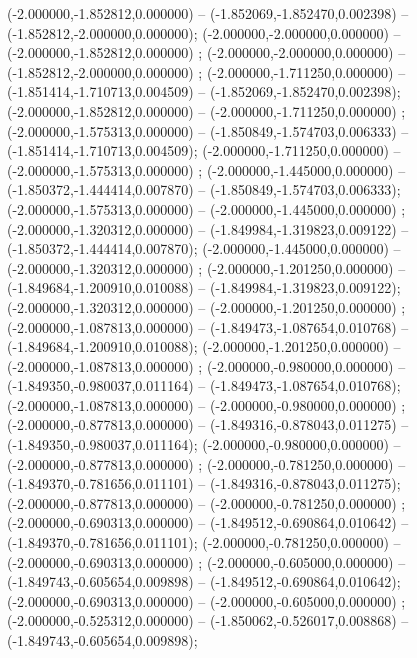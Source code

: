  (-2.000000,-1.852812,0.000000) -- (-1.852069,-1.852470,0.002398) -- (-1.852812,-2.000000,0.000000);
 (-2.000000,-2.000000,0.000000) -- (-2.000000,-1.852812,0.000000) ;
 (-2.000000,-2.000000,0.000000) -- (-1.852812,-2.000000,0.000000) ;
 (-2.000000,-1.711250,0.000000) -- (-1.851414,-1.710713,0.004509) -- (-1.852069,-1.852470,0.002398);
 (-2.000000,-1.852812,0.000000) -- (-2.000000,-1.711250,0.000000) ;
 (-2.000000,-1.575313,0.000000) -- (-1.850849,-1.574703,0.006333) -- (-1.851414,-1.710713,0.004509);
 (-2.000000,-1.711250,0.000000) -- (-2.000000,-1.575313,0.000000) ;
 (-2.000000,-1.445000,0.000000) -- (-1.850372,-1.444414,0.007870) -- (-1.850849,-1.574703,0.006333);
 (-2.000000,-1.575313,0.000000) -- (-2.000000,-1.445000,0.000000) ;
 (-2.000000,-1.320312,0.000000) -- (-1.849984,-1.319823,0.009122) -- (-1.850372,-1.444414,0.007870);
 (-2.000000,-1.445000,0.000000) -- (-2.000000,-1.320312,0.000000) ;
 (-2.000000,-1.201250,0.000000) -- (-1.849684,-1.200910,0.010088) -- (-1.849984,-1.319823,0.009122);
 (-2.000000,-1.320312,0.000000) -- (-2.000000,-1.201250,0.000000) ;
 (-2.000000,-1.087813,0.000000) -- (-1.849473,-1.087654,0.010768) -- (-1.849684,-1.200910,0.010088);
 (-2.000000,-1.201250,0.000000) -- (-2.000000,-1.087813,0.000000) ;
 (-2.000000,-0.980000,0.000000) -- (-1.849350,-0.980037,0.011164) -- (-1.849473,-1.087654,0.010768);
 (-2.000000,-1.087813,0.000000) -- (-2.000000,-0.980000,0.000000) ;
 (-2.000000,-0.877813,0.000000) -- (-1.849316,-0.878043,0.011275) -- (-1.849350,-0.980037,0.011164);
 (-2.000000,-0.980000,0.000000) -- (-2.000000,-0.877813,0.000000) ;
 (-2.000000,-0.781250,0.000000) -- (-1.849370,-0.781656,0.011101) -- (-1.849316,-0.878043,0.011275);
 (-2.000000,-0.877813,0.000000) -- (-2.000000,-0.781250,0.000000) ;
 (-2.000000,-0.690313,0.000000) -- (-1.849512,-0.690864,0.010642) -- (-1.849370,-0.781656,0.011101);
 (-2.000000,-0.781250,0.000000) -- (-2.000000,-0.690313,0.000000) ;
 (-2.000000,-0.605000,0.000000) -- (-1.849743,-0.605654,0.009898) -- (-1.849512,-0.690864,0.010642);
 (-2.000000,-0.690313,0.000000) -- (-2.000000,-0.605000,0.000000) ;
 (-2.000000,-0.525312,0.000000) -- (-1.850062,-0.526017,0.008868) -- (-1.849743,-0.605654,0.009898);
